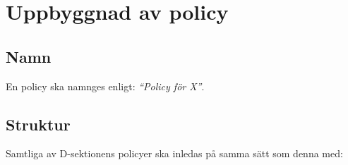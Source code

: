 \documentclass[]{dsekprotokoll}
\begin{document}
\section{Uppbyggnad av policy}

\subsection{Namn}

En policy ska namnges enligt: \textit{``Policy för X''}.

\subsection{Struktur}

Samtliga av D-sektionens policyer ska inledas på samma sätt som denna med:
\end{document}
